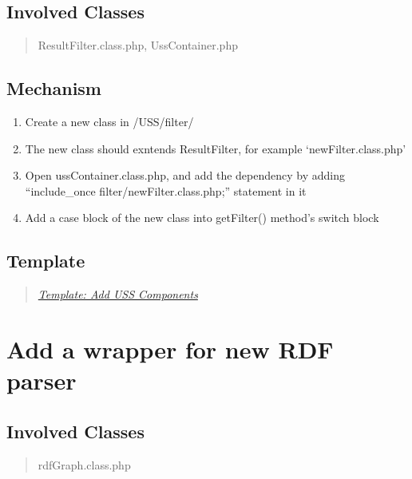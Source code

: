 \documentclass[letterpaper,10pt,english]{sphinxmanual}
\begin{document}
\subsection{Involved Classes}
\label{docs/hooks/new_filter:involved-classes}\begin{quote}

ResultFilter.class.php, UssContainer.php
\end{quote}


\subsection{Mechanism}
\label{docs/hooks/new_filter:mechanism}\begin{enumerate}
\item {} 
Create a new class in /USS/filter/

\item {} 
The new class should exntends ResultFilter, for example `newFilter.class.php'

\item {} 
Open ussContainer.class.php, and add the dependency by adding ``include\_once filter/newFilter.class.php;'' statement in it

\item {} 
Add a case block of the new class into getFilter() method's switch block

\end{enumerate}


\subsection{Template}
\label{docs/hooks/new_filter:template}\begin{quote}

{\hyperref[docs/hooks/t_uss_components:hook-template-uss]{\emph{Template: Add USS Components}}}
\end{quote}


\section{Add a wrapper for new RDF parser}
\label{docs/hooks/t_rdf_parser::doc}\label{docs/hooks/t_rdf_parser:hook-template-rdf-parser}\label{docs/hooks/t_rdf_parser:add-a-wrapper-for-new-rdf-parser}

\subsection{Involved Classes}
\label{docs/hooks/t_rdf_parser:involved-classes}\begin{quote}

rdfGraph.class.php
\end{quote}
\end{document}
